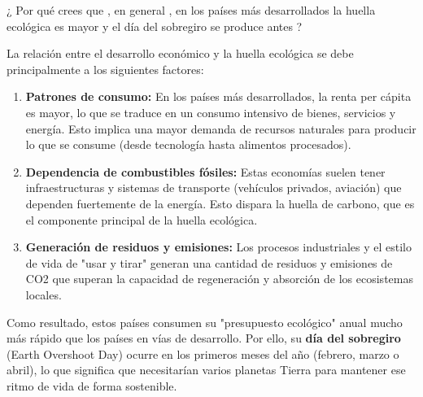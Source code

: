 {
	¿ Por qué crees que , en general , en los países más desarrollados la huella ecológica es mayor y
	el día del sobregiro se produce antes ?
}

\begin{solution}
	La relación entre el desarrollo económico y la huella ecológica se debe principalmente a los siguientes factores:

	\begin{enumerate}
		\item \textbf{Patrones de consumo:} En los países más desarrollados, la renta per cápita es mayor, lo que se traduce en un consumo intensivo de bienes, servicios y energía. Esto implica una mayor demanda de recursos naturales para producir lo que se consume (desde tecnología hasta alimentos procesados).
		\item \textbf{Dependencia de combustibles fósiles:} Estas economías suelen tener infraestructuras y sistemas de transporte (vehículos privados, aviación) que dependen fuertemente de la energía. Esto dispara la huella de carbono, que es el componente principal de la huella ecológica.
		\item \textbf{Generación de residuos y emisiones:} Los procesos industriales y el estilo de vida de "usar y tirar" generan una cantidad de residuos y emisiones de CO2 que superan la capacidad de regeneración y absorción de los ecosistemas locales.
	\end{enumerate}

	Como resultado, estos países consumen su "presupuesto ecológico" anual mucho más rápido que los países en vías de desarrollo. Por ello, su \textbf{día del sobregiro} (Earth Overshoot Day) ocurre en los primeros meses del año (febrero, marzo o abril), lo que significa que necesitarían varios planetas Tierra para mantener ese ritmo de vida de forma sostenible.
\end{solution}
